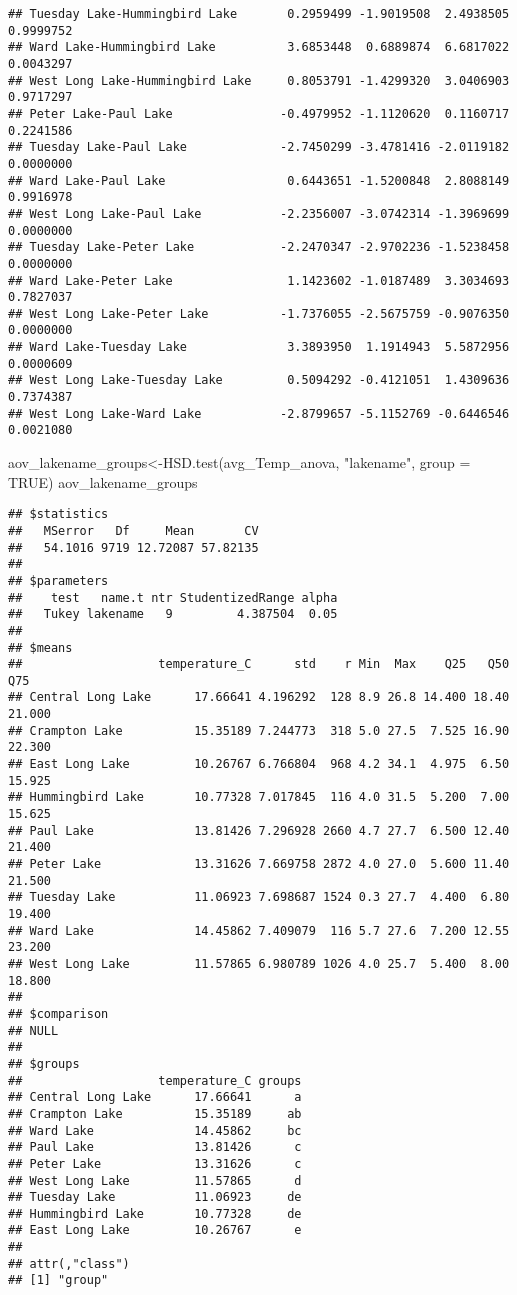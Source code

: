 \documentclass[
]{article}
\newenvironment{Shaded}{\begin{snugshade}}{\end{snugshade}}
\newcommand{\AttributeTok}[1]{\textcolor[rgb]{0.77,0.63,0.00}{#1}}
\newcommand{\ConstantTok}[1]{\textcolor[rgb]{0.00,0.00,0.00}{#1}}
\newcommand{\FunctionTok}[1]{\textcolor[rgb]{0.00,0.00,0.00}{#1}}
\newcommand{\NormalTok}[1]{#1}
\newcommand{\OtherTok}[1]{\textcolor[rgb]{0.56,0.35,0.01}{#1}}
\newcommand{\StringTok}[1]{\textcolor[rgb]{0.31,0.60,0.02}{#1}}
\begin{document}
\begin{verbatim}
## Tuesday Lake-Hummingbird Lake       0.2959499 -1.9019508  2.4938505 0.9999752
## Ward Lake-Hummingbird Lake          3.6853448  0.6889874  6.6817022 0.0043297
## West Long Lake-Hummingbird Lake     0.8053791 -1.4299320  3.0406903 0.9717297
## Peter Lake-Paul Lake               -0.4979952 -1.1120620  0.1160717 0.2241586
## Tuesday Lake-Paul Lake             -2.7450299 -3.4781416 -2.0119182 0.0000000
## Ward Lake-Paul Lake                 0.6443651 -1.5200848  2.8088149 0.9916978
## West Long Lake-Paul Lake           -2.2356007 -3.0742314 -1.3969699 0.0000000
## Tuesday Lake-Peter Lake            -2.2470347 -2.9702236 -1.5238458 0.0000000
## Ward Lake-Peter Lake                1.1423602 -1.0187489  3.3034693 0.7827037
## West Long Lake-Peter Lake          -1.7376055 -2.5675759 -0.9076350 0.0000000
## Ward Lake-Tuesday Lake              3.3893950  1.1914943  5.5872956 0.0000609
## West Long Lake-Tuesday Lake         0.5094292 -0.4121051  1.4309636 0.7374387
## West Long Lake-Ward Lake           -2.8799657 -5.1152769 -0.6446546 0.0021080
\end{verbatim}

\begin{Shaded}
\begin{Highlighting}[]
\NormalTok{aov\_lakename\_groups}\OtherTok{\textless{}{-}}\FunctionTok{HSD.test}\NormalTok{(avg\_Temp\_anova, }\StringTok{"lakename"}\NormalTok{, }\AttributeTok{group =} \ConstantTok{TRUE}\NormalTok{)}
\NormalTok{aov\_lakename\_groups}
\end{Highlighting}
\end{Shaded}

\begin{verbatim}
## $statistics
##   MSerror   Df     Mean       CV
##   54.1016 9719 12.72087 57.82135
## 
## $parameters
##    test   name.t ntr StudentizedRange alpha
##   Tukey lakename   9         4.387504  0.05
## 
## $means
##                   temperature_C      std    r Min  Max    Q25   Q50    Q75
## Central Long Lake      17.66641 4.196292  128 8.9 26.8 14.400 18.40 21.000
## Crampton Lake          15.35189 7.244773  318 5.0 27.5  7.525 16.90 22.300
## East Long Lake         10.26767 6.766804  968 4.2 34.1  4.975  6.50 15.925
## Hummingbird Lake       10.77328 7.017845  116 4.0 31.5  5.200  7.00 15.625
## Paul Lake              13.81426 7.296928 2660 4.7 27.7  6.500 12.40 21.400
## Peter Lake             13.31626 7.669758 2872 4.0 27.0  5.600 11.40 21.500
## Tuesday Lake           11.06923 7.698687 1524 0.3 27.7  4.400  6.80 19.400
## Ward Lake              14.45862 7.409079  116 5.7 27.6  7.200 12.55 23.200
## West Long Lake         11.57865 6.980789 1026 4.0 25.7  5.400  8.00 18.800
## 
## $comparison
## NULL
## 
## $groups
##                   temperature_C groups
## Central Long Lake      17.66641      a
## Crampton Lake          15.35189     ab
## Ward Lake              14.45862     bc
## Paul Lake              13.81426      c
## Peter Lake             13.31626      c
## West Long Lake         11.57865      d
## Tuesday Lake           11.06923     de
## Hummingbird Lake       10.77328     de
## East Long Lake         10.26767      e
## 
## attr(,"class")
## [1] "group"
\end{verbatim}
\end{document}
